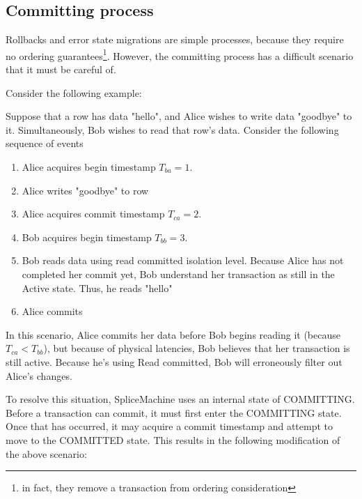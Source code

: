 \subsection{Committing process}
Rollbacks and error state migrations are simple processes, because they require no ordering guarantees\footnote{in fact, they remove a transaction from ordering consideration}. However, the committing process has a difficult scenario that it must be careful of.

Consider the following example:

\begin{exmp}
				Suppose that a row has data "hello", and Alice wishes to write data "goodbye" to it. Simultaneously, Bob wishes to read that row's data. Consider the following sequence of events
				\begin{enumerate}
					\item Alice acquires begin timestamp $T_{ba} = 1$.
					\item Alice writes "goodbye" to row
					\item Alice acquires commit timestamp $T_{ca} = 2$.
					\item Bob acquires begin timestamp $T_{bb} = 3$.
					\item Bob reads data using read committed isolation level. Because Alice has not completed her commit yet, Bob understand her transaction as still in the Active state. Thus, he reads "hello"
					\item Alice commits
				\end{enumerate}
\end{exmp}
In this scenario, Alice commits her data before Bob begins reading it (because $T_{ca} < T_{bb}$), but because of physical latencies, Bob believes that her transaction is still active. Because he's using Read committed, Bob will erroneously filter out Alice's changes.

To resolve this situation, SpliceMachine uses an internal state of COMMITTING. Before a transaction can commit, it must first enter the COMMITTING state. Once that has occurred, it may acquire a commit timestamp and attempt to move to the COMMITTED state. This results in the following modification of the above scenario:

